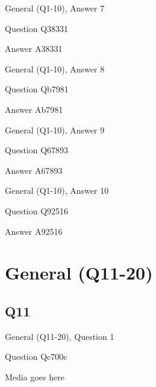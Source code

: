 \documentclass[11pt]{beamer}
\begin{document}
\begin{frame}[t]{General (Q1-10), Answer 7}
\vspace{2em}
\begin{block}{Question}
Q38331
\end{block}
\pause{}
\begin{block}{Answer}
A38331
\end{block}
\end{frame}
    

\begin{frame}[t]{General (Q1-10), Answer 8}
\vspace{2em}
\begin{block}{Question}
Qb7981
\end{block}
\pause{}
\begin{block}{Answer}
Ab7981
\end{block}
\end{frame}
    

\begin{frame}[t]{General (Q1-10), Answer 9}
\vspace{2em}
\begin{block}{Question}
Q67893
\end{block}
\pause{}
\begin{block}{Answer}
A67893
\end{block}
\end{frame}
    

\begin{frame}[t]{General (Q1-10), Answer 10}
\vspace{2em}
\begin{block}{Question}
Q92516
\end{block}
\pause{}
\begin{block}{Answer}
A92516
\end{block}
\end{frame}
    

\section{General (Q11-20)}
    

\subsection*{Q11}
\begin{frame}[t]{General (Q11-20), Question 1}
\vspace{2em}
\begin{block}{Question}
Qc700c
\end{block}
\begin{center}
Media goes here
\end{center}
\end{frame}
    
\end{document}
